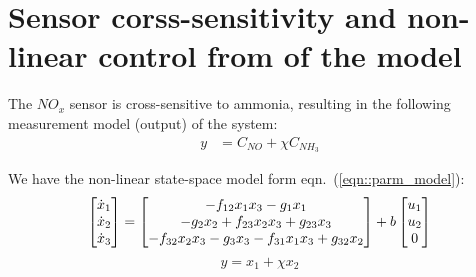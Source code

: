 \section{Sensor corss-sensitivity and non-linear control from of the model}

The $NO_x$ sensor is cross-sensitive to ammonia, resulting in the following
measurement model (output) of the system:
\begin{align*}
    y &= C_{NO} + \chi C_{NH_3}
\end{align*}

We have the non-linear state-space model form eqn.~(\ref{eqn::parm_model}):
\begin{equation}\label{eqn::ctrl_state}
    \begin{bmatrix} \dot x_1 \\
        \dot x_2\\
        \dot x_3\\
         \end{bmatrix} =
    \begin{bmatrix} 
        -f_{12} x_1 x_3
        -g_1 x_1
        \\
        -g_2 x_2
        + f_{23} x_2 x_3
        + g_{23} x_3
        \\
        -f_{32} x_2 x_3
        -g_3 x_3
        -f_{31} x_1 x_3
        + g_{32} x_2
     \end{bmatrix}
    + b \begin{bmatrix} u_1 \\ u_2 \\ 0 \end{bmatrix}
\end{equation}
\begin{equation}\label{eqn::ctrl_out}
    y = x_1 + \chi x_2
\end{equation}
